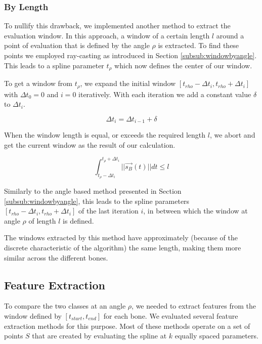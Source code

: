 \documentclass[pdftex,12pt,a4paper]{report}
\begin{document}
\subsubsection{By Length}
\label{subsub:windowbylength}

To nullify this drawback, we implemented another method to extract the evaluation window.
In this approach, a window of a certain length $l$ around a point of evaluation that is defined by the angle $\rho$ is extracted. To find these points we employed ray-casting
as introduced in Section \ref{subsub:windowbyangle}. This leads to a spline parameter
$t_\rho$ which now defines the center of our window.

To get a window from $t_\rho$, we expand the initial window $[t_{rho}-\Delta t_i,
t_{rho}+\Delta t_i]$ with $\Delta t_0 = 0$ and $i=0$ iteratively. With each iteration we add a constant value $\delta$ to $\Delta t_i$.

\begin{equation}
\Delta t_i = \Delta t_{i-1} + \delta
\end{equation}

When the window length is equal, or exceeds the required length $l$, we abort and get the current
window as the result of our calculation.

\begin{equation}
\int_{t_\rho - \Delta t_i}^{t_\rho + \Delta t_i} ||\vec{s_B}(t)|| dt \leq l
\end{equation}

Similarly to the angle based method presented in Section \ref{subsub:windowbyangle}, this leads to the spline parameters $[t_{rho}-\Delta t_i, t_{rho}+\Delta t_i]$ of the last iteration $i$, in between which the window at angle $\rho$ of length $l$ is defined.

The windows extracted by this method have approximately (because of the discrete
characteristic of the algorithm) the same length, making them more similar across
the different bones.

\subsection{Feature Extraction}
\label{sub:featureextraction}

To compare the two classes at an angle $\rho$, we needed to extract features from the
window defined by $[t_{start}, t_{end}]$ for each bone. We evaluated several feature
extraction methods for this purpose. Most of these methods operate on a set of points
$S$ that are created by evaluating the spline at $k$ equally spaced parameters.
\end{document}
